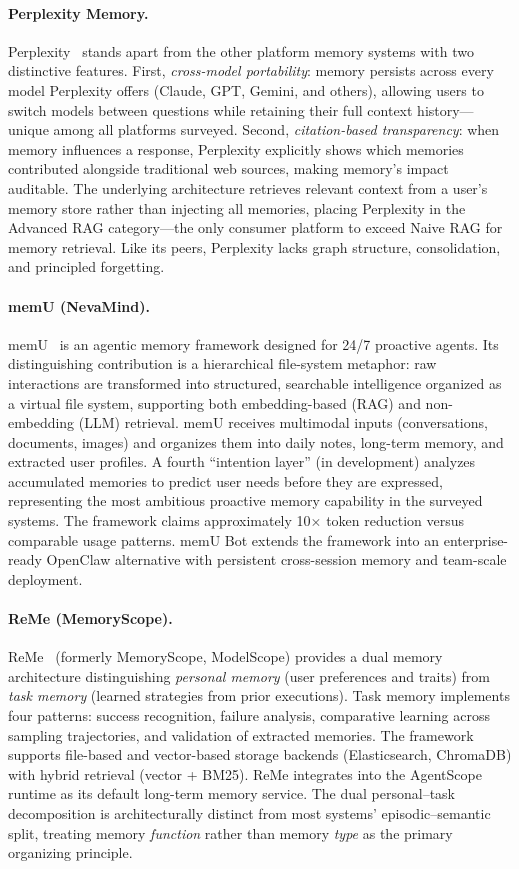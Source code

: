\paragraph{Perplexity Memory.}
Perplexity~\cite{perplexity2025memory} stands apart from the other
platform memory systems with two distinctive features.  First,
\emph{cross-model portability}: memory persists across every model
Perplexity offers (Claude, GPT, Gemini, and others), allowing users
to switch models between questions while retaining their full context
history---unique among all platforms surveyed.  Second,
\emph{citation-based transparency}: when memory influences a response,
Perplexity explicitly shows which memories contributed alongside
traditional web sources, making memory's impact auditable.  The
underlying architecture retrieves relevant context from a user's memory
store rather than injecting all memories, placing Perplexity in the
Advanced RAG category---the only consumer platform to exceed Naive RAG
for memory retrieval.  Like its peers, Perplexity lacks graph structure,
consolidation, and principled forgetting.

\paragraph{memU (NevaMind).}
memU~\cite{memu2026} is an agentic memory framework designed for 24/7
proactive agents.  Its distinguishing contribution is a hierarchical
file-system metaphor: raw interactions are transformed into structured,
searchable intelligence organized as a virtual file system, supporting
both embedding-based (RAG) and non-embedding (LLM) retrieval.  memU
receives multimodal inputs (conversations, documents, images) and
organizes them into daily notes, long-term memory, and extracted user
profiles.  A fourth ``intention layer'' (in development) analyzes
accumulated memories to predict user needs before they are expressed,
representing the most ambitious proactive memory capability in the
surveyed systems.  The framework claims approximately 10$\times$ token
reduction versus comparable usage patterns.  memU Bot extends the
framework into an enterprise-ready OpenClaw alternative with persistent
cross-session memory and team-scale deployment.

\paragraph{ReMe (MemoryScope).}
ReMe~\cite{reme2025} (formerly MemoryScope, ModelScope) provides a dual
memory architecture distinguishing \emph{personal memory} (user
preferences and traits) from \emph{task memory} (learned strategies from
prior executions).  Task memory implements four patterns: success
recognition, failure analysis, comparative learning across sampling
trajectories, and validation of extracted memories.  The framework
supports file-based and vector-based storage backends (Elasticsearch,
ChromaDB) with hybrid retrieval (vector + BM25).  ReMe integrates into
the AgentScope runtime as its default long-term memory service.  The
dual personal--task decomposition is architecturally distinct from most
systems' episodic--semantic split, treating memory \emph{function} rather
than memory \emph{type} as the primary organizing principle.

